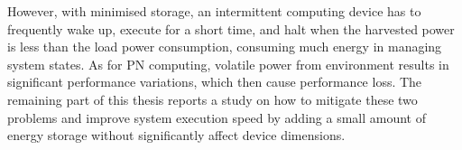 However, with minimised storage, an intermittent computing device has to frequently wake up, execute for a short time, and halt when the harvested power is less than the load power consumption, consuming much energy in managing system states. As for PN computing, volatile power from environment results in significant performance variations, which then cause performance loss. The remaining part of this thesis reports a study on how to mitigate these two problems and improve system execution speed by adding a small amount of energy storage without significantly affect device dimensions. 

